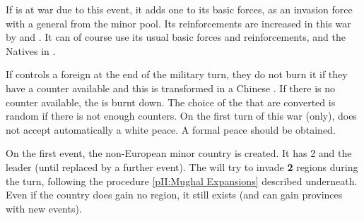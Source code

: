 \phmil
\aparag If \paysChine is at war due to this event, it adds one \ARMY\faceplus
to its basic forces, as an invasion force with a general from the minor
pool. Its reinforcements are increased in this war by \LD and \ND. It can of
course use its usual basic forces and reinforcements, and the Natives in
\paysChine.

\phpaix
\aparag If \paysChine controls a foreign \TP at the end of the military turn,
they do not burn it if they have a \TP counter available and this \TP is
transformed in a Chinese \TP. If there is no counter available, the \TP is
burnt down. The choice of the \TP that are converted is random if there is not
enough counters.
\aparag On the first turn of this war (only), \paysChine does not accept
automatically a white peace. A formal peace should be obtained.





\phevnt
\aparag On the first event, the non-European minor country \paysMogol is
created. It has 2 \ARMY\faceplus and the leader  (until
replaced by a further event).
\aparag The \paysMogol will try to invade \textbf{2} regions during the turn,
following the procedure \ref{pII:Mughal Expansions} described underneath.
\aparag Even if the country does gain no region, it still exists (and can gain
provinces with new events).






